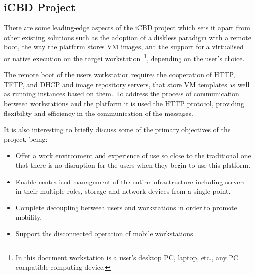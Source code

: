


\subsection{iCBD Project} %
\label{sub:intro_icbd_project}

There are some leading-edge aspects of the \acrfull{iCBD} project which sets it apart from other existing solutions such as the adoption of a diskless paradigm with a remote boot, the way the platform stores \gls{VM} images, and the support for a virtualised or native execution on the target workstation~\footnote{In this document workstation is a user's desktop PC, laptop, etc., any PC compatible computing device.}, depending on the user's choice.~\cite{P2020}

The remote boot of the users workstation requires the cooperation of \acrshort{HTTP}, \acrshort{TFTP}, and \acrshort{DHCP} and image repository servers, that store VM templates as well as running instances based on them.
To address the process of communication between workstations and the platform it is used the HTTP protocol, providing flexibility and efficiency in the communication of the messages.~\cite{P2020,Nuno2016,Eduardo2016}



It is also interesting to briefly discuss some of the primary objectives of the project, being:
\begin{itemize}
    \item Offer a work environment and experience of use so close to the traditional one that there is no disruption for the users when they begin to use this platform.
    \item Enable centralised management of the entire infrastructure including servers in their multiple roles, storage and network devices from a single point.
    \item Complete decoupling between users and workstations in order to promote mobility.
    \item Support the disconnected operation of mobile workstations.
\end{itemize}

